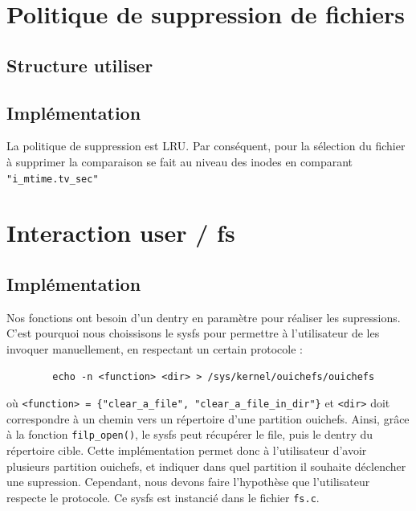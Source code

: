 \documentclass{article}
\begin{document}
	\section{Politique de suppression de fichiers}
	\subsection{Structure utiliser}
	\subsection{Implémentation}
	La politique de suppression est LRU. Par conséquent, pour la sélection du fichier à supprimer la comparaison se fait au niveau des inodes en comparant \verb|"i_mtime.tv_sec"|
	\section{Interaction user / fs}
	\subsection{Implémentation}
	Nos fonctions ont besoin d'un dentry en paramètre pour réaliser les supressions. C'est pourquoi nous choissisons le sysfs pour permettre à l'utilisateur de les invoquer manuellement, en respectant un certain protocole : 
	\begin{lstlisting}
    	echo -n <function> <dir> > /sys/kernel/ouichefs/ouichefs
	\end{lstlisting}
    où \verb|<function> = {"clear_a_file", "clear_a_file_in_dir"}| et \verb|<dir>| doit correspondre à un chemin vers un répertoire d'une partition ouichefs. Ainsi, grâce à la fonction \verb|filp_open()|, le sysfs peut récupérer le file, puis le dentry du répertoire cible. Cette implémentation permet donc à l'utilisateur d'avoir plusieurs partition ouichefs, et indiquer dans quel partition il souhaite déclencher une supression. Cependant, nous devons faire l'hypothèse que l'utilisateur respecte le protocole.
    Ce sysfs est instancié dans le fichier \verb|fs.c|. 
\end{document}
